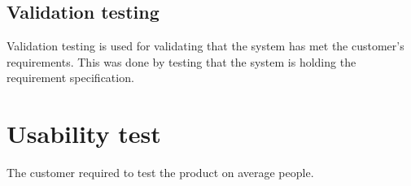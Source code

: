 		\subsection{Validation testing}
			Validation testing is used for validating that the system has met the customer's requirements. This was done by testing that the system is holding the requirement specification.

	\section{Usability test}
		The customer required to test the product on average people.

